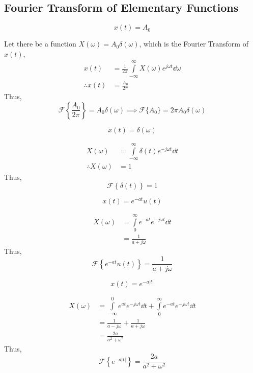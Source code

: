 		\subsection{Fourier Transform of Elementary Functions}
		\begin{eg}[D.C. Value]
			\[x(t)=A_0\]
		\end{eg}
		\begin{explanation}
			Let there be a function $X(\omega)=A_0\delta(\omega)$, which is the Fourier Transform of $x(t)$, 
			\[\begin{split}
				x(t)&=\frac{1}{2\pi}\int\limits_{-\infty}^\infty X(\omega)e^{j\omega t}\dd{\omega}\\
				\therefore x(t)&=\frac{A_0}{2\pi}
			\end{split}\]
			Thus, 
			\[\mathcal{F} \left\{\frac{A_0}{2\pi}\right\}=A_0\delta(\omega) \implies \mathcal{F}\{A_0\}=2\pi A_0\delta(\omega)\]
		\end{explanation}
		\begin{eg}
			\[x(t)=\delta(\omega)\]
		\end{eg}
		\begin{explanation}
			\[\begin{split}
				X(\omega)&=\int\limits_{-\infty}^\infty \delta(t)e^{-j\omega t}\dd{t}\\
				\therefore X(\omega)&=1
			\end{split}\]
			Thus,
			\[\mathcal{F}\left\{\delta(t)\right\}=1\]
		\end{explanation}
		\begin{eg}[Exponential]
			\[x(t)=e^{-at}u(t)\]
		\end{eg}
		\begin{explanation}
			\[\begin{split}
				X(\omega)&=\int\limits_{0}^\infty e^{-at}e^{-j\omega t}\dd{t}\\
				&=\frac{1}{a+j\omega}
			\end{split}\]
			Thus,
			\[\mathcal{F}\left\{e^{-at}u(t)\right\}=\frac{1}{a+j\omega}\]
		\end{explanation}
		\begin{eg}[Exponential]
			\[x(t)=e^{-a|t|}\]
		\end{eg}
		\begin{explanation}
			\[\begin{split}
				X(\omega)&=\int\limits_{-\infty}^0 e^{at}e^{-j\omega t}\dd{t}+\int\limits_{0}^\infty e^{-at}e^{-j\omega t}\dd{t}\\
				&=\frac{1}{a-j\omega}+\frac{1}{a+j\omega}\\
				&=\frac{2a}{a^2+\omega^2}
			\end{split}\]
			Thus,
			\[\mathcal{F}\left\{e^{-a|t|}\right\}=\frac{2a}{a^2+\omega^2}\]
		\end{explanation}
